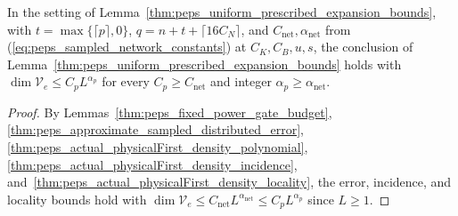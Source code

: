 \begin{lemma}
    \label{thm:peps_uniform_prescribed_expansion_bounds_of_le}
    \leanok
    In the setting of Lemma~\ref{thm:peps_uniform_prescribed_expansion_bounds}, with $t=\max\{\lceil p\rceil,0\}$, $q=n+t+\lceil16C_N\rceil$, and $C_{\mathrm{net}},\alpha_{\mathrm{net}}$ from (\ref{eq:peps_sampled_network_constants}) at $C_K,C_B,u,s$, the conclusion of Lemma~\ref{thm:peps_uniform_prescribed_expansion_bounds} holds with $\dim\mathcal V_e\le C_pL^{\alpha_p}$ for every $C_p\ge C_{\mathrm{net}}$ and integer $\alpha_p\ge\alpha_{\mathrm{net}}$.
\end{lemma}
\begin{proof}
    \leanok
    By Lemmas~\ref{thm:peps_fixed_power_gate_budget}, \ref{thm:peps_approximate_sampled_distributed_error}, \ref{thm:peps_actual_physicalFirst_density_polynomial}, \ref{thm:peps_actual_physicalFirst_density_incidence}, and~\ref{thm:peps_actual_physicalFirst_density_locality}, the error, incidence, and locality bounds hold with $\dim\mathcal V_e\le C_{\mathrm{net}}L^{\alpha_{\mathrm{net}}}\le C_pL^{\alpha_p}$ since $L\ge1$.
\end{proof}

